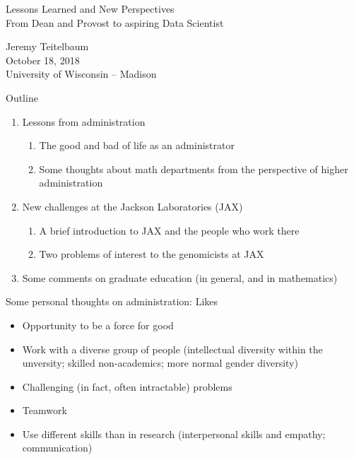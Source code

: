 \documentclass{beamer}
\begin{document}
\begin{frame}
\begin{center}
{\Large
Lessons Learned and New Perspectives \\
From Dean and Provost to aspiring Data Scientist
}
\end{center}

\vskip 1in
{\small
Jeremy Teitelbaum \\
October 18, 2018 \\
University of Wisconsin -- Madison
}
\end{frame}
\begin{frame}{Outline}
\begin{enumerate}
\item Lessons from administration
\begin{enumerate}
\item The good and bad of life as an administrator
\item Some thoughts about math departments from the perspective of higher administration
\end{enumerate}
\item New challenges at the Jackson Laboratories (JAX)
\begin{enumerate}
\item A brief introduction to JAX and the people who work there
\item Two problems of interest to the genomicists at JAX
\end{enumerate}
\item Some comments on graduate education (in general, and in mathematics)
\end{enumerate}
\end{frame}

\begin{frame}{Some personal thoughts on administration: Likes}
\begin{itemize}
\item Opportunity to be a force for good
  \item Work with a diverse group of people (intellectual diversity within the unversity; skilled non-academics; more normal gender diversity)
  \item Challenging (in fact, often intractable) problems
  \item Teamwork
    \item Use different skills than in research (interpersonal skills and empathy; communication)
\end{itemize}
\end{frame}
\end{document}

